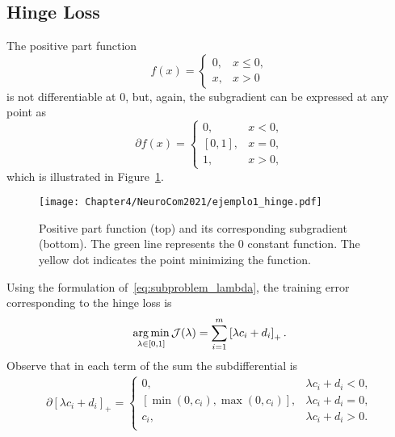 \subsection{Hinge Loss}
The positive part function 
\begin{equation}
    \nonumber
    f(x) = 
    \begin{cases}
    0 ,& x \leq 0, \\
    x ,& x > 0    
    \end{cases}
\end{equation}
is not differentiable at $0$, but, again, the subgradient can be expressed at any point as
\begin{equation}
    \nonumber
    \partial f(x) = 
    \begin{cases}
    0 ,& x < 0, \\
    [0, 1] ,& x = 0 , \\
    1 ,& x > 0 ,
    \end{cases}
\end{equation}
which is illustrated in Figure~\ref{fig:hinge_loss}.
\begin{figure}[t!]
    \centering
    \texttt{[image: Chapter4/NeuroCom2021/ejemplo1\_hinge.pdf]}
    \caption{Positive part function (top) and its corresponding subgradient (bottom). The green line represents the $0$ constant function. The yellow dot indicates the point minimizing the function.}
    \label{fig:hinge_loss}
\end{figure}
Using the formulation of~\eqref{eq:subproblem_lambda}, the training error corresponding to the hinge loss is
\begin{equation}
    \label{eq:opt_hinge_l1}
    \argmin_{\lambda \in [0, 1]} \mathcal{J}(\lambda) = \sum_{i=1}^{\npertask} \pospart{\lambda c_i + d_i}.
\end{equation}
Observe that in each term of the sum the subdifferential is 
\begin{equation}
    \label{eq:subdiff_hinge_l1}
    \begin{aligned}
        \partial \left[\lambda c_i + d_i \right]_+ = 
    \begin{cases}
        0 ,& \lambda c_i + d_i  < 0, \\
        [\min(0, c_i), \max(0, c_i)] ,& \lambda c_i + d_i  = 0, \\
        c_i ,& \lambda c_i + d_i  > 0. \\
    \end{cases}
    \end{aligned}
\end{equation}
